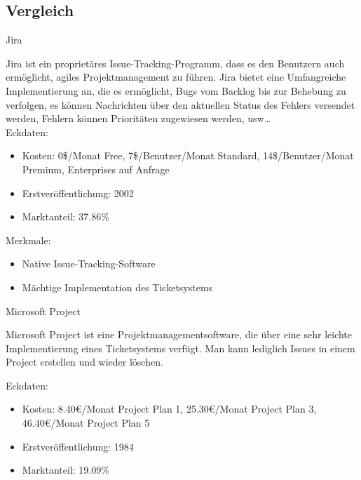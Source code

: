 		\subsection{Vergleich}
		
			Jira
			
			Jira ist ein proprietäres Issue-Tracking-Programm, dass es den Benutzern auch ermöglicht, agiles Projektmanagement zu führen. Jira bietet eine Umfangreiche Implementierung an, die es ermöglicht, Bugs vom Backlog bis zur Behebung zu verfolgen, es können Nachrichten über den aktuellen Status des Fehlers versendet werden, Fehlern können Prioritäten zugewiesen werden, usw… \\
			
			 Eckdaten:
				\begin{itemize}
					\item Kosten: 0\$/Monat Free, 7\$/Benutzer/Monat Standard, 14\$/Benutzer/Monat Premium, Enterprises auf Anfrage
					\item Erstveröffentlichung: 2002
					\item Marktanteil: 37.86\%
				\end{itemize}
				
				Merkmale:
				\begin{itemize}
					\item Native Issue-Tracking-Software
					\item Mächtige Implementation des Ticketsystems
				\end{itemize}
				

				
				
				Microsoft Project
				
				Microsoft Project ist eine Projektmanagementsoftware, die über eine sehr leichte Implementierung eines Ticketsystems verfügt. Man kann lediglich Issues in einem Project erstellen und wieder löschen.
				
				Eckdaten:
				\begin{itemize}
					\item Kosten: 8.40€/Monat Project Plan 1, 25.30€/Monat Project Plan 3, 46.40€/Monat Project Plan 5
					\item Erstveröffentlichung: 1984
					\item Marktanteil: 19.09\%
				\end{itemize}
				
